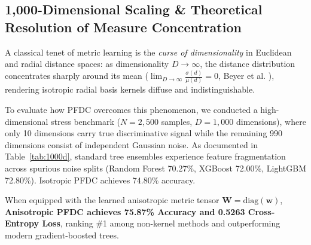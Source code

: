 \documentclass[preprint,review,12pt]{elsarticle}
\begin{document}
\subsection{1,000-Dimensional Scaling \& Theoretical Resolution of Measure Concentration}
\label{sec:highd_scaling}
A classical tenet of metric learning is the \emph{curse of dimensionality} in Euclidean and radial distance spaces: as dimensionality $D \to \infty$, the distance distribution concentrates sharply around its mean ($\lim_{D \to \infty} \frac{\sigma(d)}{\mu(d)} = 0$, Beyer et al. \cite{beyer1999nearest}), rendering isotropic radial basis kernels diffuse and indistinguishable.

To evaluate how PFDC overcomes this phenomenon, we conducted a high-dimensional stress benchmark ($N=2,500$ samples, $D=1,000$ dimensions), where only 10 dimensions carry true discriminative signal while the remaining 990 dimensions consist of independent Gaussian noise. As documented in Table~\ref{tab:1000d}, standard tree ensembles experience feature fragmentation across spurious noise splits (Random Forest 70.27\%, XGBoost 72.00\%, LightGBM 72.80\%). Isotropic PFDC achieves 74.80\% accuracy.

When equipped with the learned anisotropic metric tensor $\mathbf{W} = \mathrm{diag}(\mathbf{w})$, \textbf{Anisotropic PFDC achieves 75.87\% Accuracy and 0.5263 Cross-Entropy Loss}, ranking \#1 among non-kernel methods and outperforming modern gradient-boosted trees.

\begin{table}[!htbp]
\centering
\small
\caption{1,000-Dimensional Stress Benchmark ($N=2,500, D=1,000$, 10 Informative Signal Features, 990 Noise Features).}
\label{tab:1000d}
\end{table}
\end{document}
